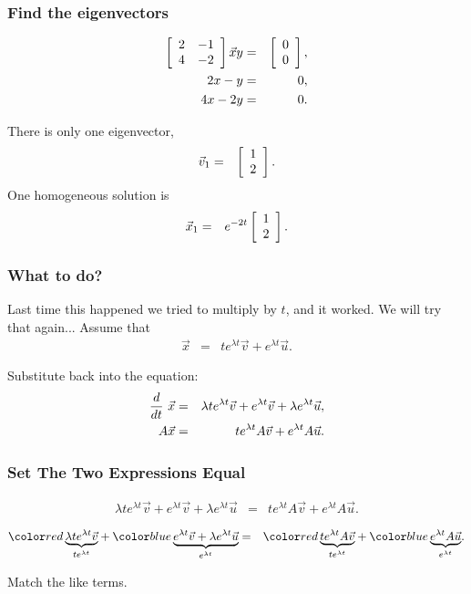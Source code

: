 \begin{frame}
  \frametitle{Find the eigenvectors}

  \begin{eqnarray*}
    \arrayTwo{2}{-1}{4}{-2} \vec{x}{y} & = & \vecTwo{0}{0}, \\
    2x - y & = & 0, \\
    4x - 2y & = & 0.
  \end{eqnarray*}

  There is only one eigenvector,
  \begin{eqnarray*}
    \vec{v}_1 & = & \vecTwo{1}{2}.
  \end{eqnarray*}
  One homogeneous solution is 
  \begin{eqnarray*}
   \vec{x}_1 & = & e^{-2t}\vecTwo{1}{2}.
  \end{eqnarray*}

\end{frame}

\begin{frame}
  \frametitle{What to do?}

  Last time this happened we tried to multiply by $t$, and it
  worked. We will try that again...
  Assume that
  \begin{eqnarray*}
    \vec{x} & = & t e^{\lambda t} \vec{v} + e^{\lambda t} \vec{u}.
  \end{eqnarray*}

  {
    Substitute back into the equation:
    \begin{eqnarray*}
      \deriv{~}{t} \vec{x} & = & \lambda t e^{\lambda t} \vec{v} + e^{\lambda t} \vec{v} 
         + \lambda e^{\lambda t} \vec{u}, \\
      A\vec{x} & = & t e^{\lambda t} A \vec{v} + e^{\lambda t} A \vec{u}.
    \end{eqnarray*}
  }
  
\end{frame}


\begin{frame}
  \frametitle{Set The Two Expressions Equal}

  {
    \begin{eqnarray*}
      \lambda t e^{\lambda t} \vec{v} + e^{\lambda t} \vec{v} + \lambda e^{\lambda t} \vec{u}
      & = & 
      t e^{\lambda t} A \vec{v} + e^{\lambda t} A \vec{u}.
    \end{eqnarray*}
  }

  {
    \begin{eqnarray*}
      \redText{\underbrace{\lambda t e^{\lambda t} \vec{v}}_ {te^{\lambda t}}} +  
      \blueText{\underbrace{e^{\lambda t} \vec{v} + \lambda e^{\lambda t} \vec{u}}_{e^{\lambda t}}}
      & = & 
      \redText{\underbrace{t e^{\lambda t} A \vec{v}}_{t e^{\lambda t}}} + 
      \blueText{\underbrace{e^{\lambda t} A \vec{u}}_{e^{\lambda t}}}.
    \end{eqnarray*}

    Match the like terms.

  }
  

\end{frame}


